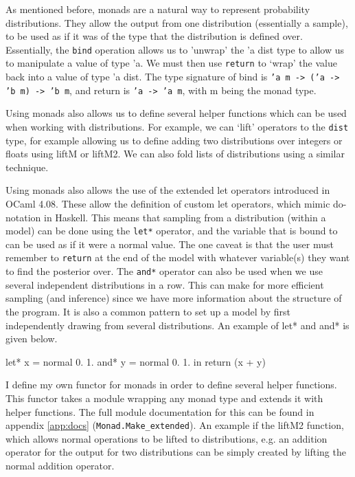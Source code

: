 As mentioned before, monads are a natural way to represent probability distributions. They allow the output from one distribution (essentially a sample), to be used as if it was of the type that the distribution is defined over. Essentially, the \texttt{bind} operation allows us to 'unwrap' the 'a dist type to allow us to manipulate a value of type 'a. We must then use \texttt{return} to `wrap' the value back into a value of type 'a dist. The type signature of bind is \texttt{'a m -> ('a -> 'b m) -> 'b m}, and return is \texttt{'a -> 'a m}, with m being the monad type.

Using monads also allows us to define several helper functions which can be used when working with distributions. For example, we can `lift' operators to the \texttt{dist} type, for example allowing us to define adding two distributions over integers or floats using liftM or liftM2. We can also fold lists of distributions using a similar technique.

Using monads also allows the use of the extended let operators introduced in OCaml 4.08. These allow the definition of custom let operators, which mimic do-notation in Haskell. This means that sampling from a distribution (within a model) can be done using the \texttt{let*} operator, and the variable that is bound to can be used as if it were a normal value. The one caveat is that the user must remember to \texttt{return} at the end of the model with whatever variable(s) they want to find the posterior over. The \texttt{and*} operator can also be used when we use several independent distributions in a row. This can make for more efficient sampling (and inference) since we have more information about the structure of the program. It is also a common pattern to set up a model by first independently drawing from several distributions. An example of let* and and* is given below.

\begin{ocamlcode-in}
let* x = normal 0. 1.
and* y = normal 0. 1. in
return (x + y)
\end{ocamlcode-in}
		
I define my own functor for monads in order to define several helper functions. This functor takes a module wrapping any monad type and extends it with helper functions. The full module documentation for this can be found in appendix \ref{app:docs} (\texttt{Monad.Make\_extended}). An example if the liftM2 function, which allows normal operations to be lifted to distributions, e.g. an addition operator for the output for two distributions can be simply created by lifting the normal addition operator.

